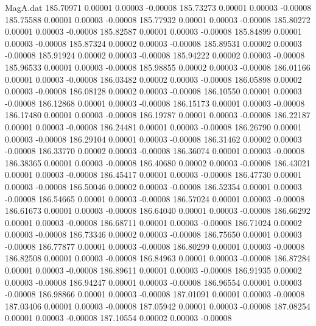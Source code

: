 \begin{filecontents}{MagA.dat}
 185.70971    0.00001    0.00003   -0.00008
 185.73273    0.00001    0.00003   -0.00008
 185.75588    0.00001    0.00003   -0.00008
 185.77932    0.00001    0.00003   -0.00008
 185.80272    0.00001    0.00003   -0.00008
 185.82587    0.00001    0.00003   -0.00008
 185.84899    0.00001    0.00003   -0.00008
 185.87324    0.00002    0.00003   -0.00008
 185.89531    0.00002    0.00003   -0.00008
 185.91924    0.00002    0.00003   -0.00008
 185.94222    0.00002    0.00003   -0.00008
 185.96533    0.00001    0.00003   -0.00008
 185.98855    0.00002    0.00003   -0.00008
 186.01166    0.00001    0.00003   -0.00008
 186.03482    0.00002    0.00003   -0.00008
 186.05898    0.00002    0.00003   -0.00008
 186.08128    0.00002    0.00003   -0.00008
 186.10550    0.00001    0.00003   -0.00008
 186.12868    0.00001    0.00003   -0.00008
 186.15173    0.00001    0.00003   -0.00008
 186.17480    0.00001    0.00003   -0.00008
 186.19787    0.00001    0.00003   -0.00008
 186.22187    0.00001    0.00003   -0.00008
 186.24481    0.00001    0.00003   -0.00008
 186.26790    0.00001    0.00003   -0.00008
 186.29104    0.00001    0.00003   -0.00008
 186.31462    0.00002    0.00003   -0.00008
 186.33770    0.00002    0.00003   -0.00008
 186.36074    0.00001    0.00003   -0.00008
 186.38365    0.00001    0.00003   -0.00008
 186.40680    0.00002    0.00003   -0.00008
 186.43021    0.00001    0.00003   -0.00008
 186.45417    0.00001    0.00003   -0.00008
 186.47730    0.00001    0.00003   -0.00008
 186.50046    0.00002    0.00003   -0.00008
 186.52354    0.00001    0.00003   -0.00008
 186.54665    0.00001    0.00003   -0.00008
 186.57024    0.00001    0.00003   -0.00008
 186.61673    0.00001    0.00003   -0.00008
 186.64040    0.00001    0.00003   -0.00008
 186.66292    0.00001    0.00003   -0.00008
 186.68711    0.00001    0.00003   -0.00008
 186.71024    0.00002    0.00003   -0.00008
 186.73346    0.00002    0.00003   -0.00008
 186.75650    0.00001    0.00003   -0.00008
 186.77877    0.00001    0.00003   -0.00008
 186.80299    0.00001    0.00003   -0.00008
 186.82508    0.00001    0.00003   -0.00008
 186.84963    0.00001    0.00003   -0.00008
 186.87284    0.00001    0.00003   -0.00008
 186.89611    0.00001    0.00003   -0.00008
 186.91935    0.00002    0.00003   -0.00008
 186.94247    0.00001    0.00003   -0.00008
 186.96554    0.00001    0.00003   -0.00008
 186.98866    0.00001    0.00003   -0.00008
 187.01091    0.00001    0.00003   -0.00008
 187.03406    0.00001    0.00003   -0.00008
 187.05942    0.00001    0.00003   -0.00008
 187.08254    0.00001    0.00003   -0.00008
 187.10554    0.00002    0.00003   -0.00008

\end{filecontents}
